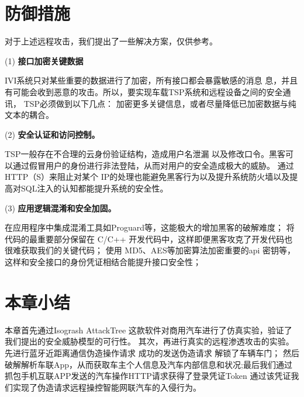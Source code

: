 \section{防御措施}
对于上述远程攻击，我们提出了一些解决方案，仅供参考。

(1) \textbf{接口加密关键数据}

IVI系统只对某些重要的数据进行了加密，所有接口都会暴露敏感的消息
息，并且有可能会收到恶意的攻击。所以，要实现车载TSP系统和远程设备之间的安全通讯， TSP必须做到以下几点：
加密更多关键信息，或者尽量降低已加密数据与纯文本的耦合。

(2) \textbf{安全认证和访问控制。} 

TSP一般存在不合理的云身份验证结构，造成用户名泄漏
以及修改口令。黑客可以通过假冒用户的身份进行非法登陆，从而对用户的安全造成极大的威胁。
通过 HTTP（S）来阻止对某个 IP的处理也能避免黑客行为以及提升系统防火墙以及提高对SQL注入的认知都能提升系统的安全性。

(3) \textbf{应用逻辑混淆和安全加固。} 

在应用程序中集成混淆工具如Proguard等，这能极大的增加黑客的破解难度；
将代码的最重要部分保留在 C/C++ 开发代码中，这样即便黑客攻克了开发代码也很难获取我们的关键代码；
使用 MD5、AES等加密算法加密重要的api 密钥等，这样和安全接口的身份凭证相结合能提升接口安全性；

\section{本章小结}
本章首先通过Isogrash AttackTree 这款软件对商用汽车进行了仿真实验，验证了我们提出的安全威胁模型的可行性。
其次，再进行真实的远程渗透攻击的实验。先进行蓝牙近距离通信伪造操作请求 成功的发送伪造请求 解锁了车辆车门；
然后破解解析车联App，从而获取车主个人信息及汽车内部信息和状况;最后我们通过抓包手机互联APP发送的汽车操作HTTP请求获得了登录凭证Token
通过该凭证我们实现了伪造请求远程操控智能网联汽车的入侵行为。
